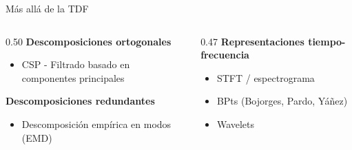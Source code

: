 

\begin{frame}{Más allá de la TDF}
  \begin{columns}[T]
    \begin{column}{0.50\textwidth}
      \textbf{Descomposiciones ortogonales}
      \begin{itemize}
        \item CSP - Filtrado basado en componentes principales 
      \end{itemize}
      \vspace{0.4em}
      \textbf{Descomposiciones redundantes}
      \begin{itemize}
        \item Descomposición empírica en modos (EMD)
      \end{itemize}
    \end{column}
    \begin{column}{0.47\textwidth}
      \textbf{Representaciones tiempo-frecuencia}
      \begin{itemize}
        \item STFT / espectrograma
        \item BPts  (Bojorges, Pardo, Yáñez) \cite{Pardo2025}
        \item Wavelets \cite{Tallon-Baudry1997, Moca2021}
      \end{itemize}
      \vspace{0.3em}
    \end{column}
  \end{columns}
\end{frame}
